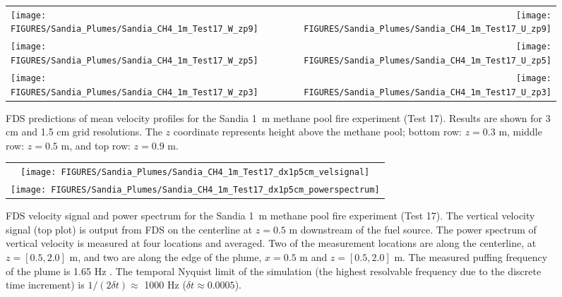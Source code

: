 \begin{figure}[p]
\begin{tabular*}{\textwidth}{l@{\extracolsep{\fill}}r}
\texttt{[image: FIGURES/Sandia\_Plumes/Sandia\_CH4\_1m\_Test17\_W\_zp9]} &
\texttt{[image: FIGURES/Sandia\_Plumes/Sandia\_CH4\_1m\_Test17\_U\_zp9]} \\
\texttt{[image: FIGURES/Sandia\_Plumes/Sandia\_CH4\_1m\_Test17\_W\_zp5]} &
\texttt{[image: FIGURES/Sandia\_Plumes/Sandia\_CH4\_1m\_Test17\_U\_zp5]} \\
\texttt{[image: FIGURES/Sandia\_Plumes/Sandia\_CH4\_1m\_Test17\_W\_zp3]} &
\texttt{[image: FIGURES/Sandia\_Plumes/Sandia\_CH4\_1m\_Test17\_U\_zp3]}
\end{tabular*}
\caption[Sandia 1~m methane pool fire (Test 17) mean velocity profiles]
{FDS predictions of mean velocity profiles for the Sandia 1~m methane pool fire experiment (Test 17). Results are shown for 3 cm and 1.5 cm grid resolutions. The $z$ coordinate represents height above the methane pool; bottom row: $z=0.3$ m, middle row: $z=0.5$ m, and top row: $z=0.9$ m.}
\label{Sandia_CH4_1m_Test17_velocity}
\end{figure}

\begin{figure}[p]
\begin{center}
\begin{tabular}{c}
\texttt{[image: FIGURES/Sandia\_Plumes/Sandia\_CH4\_1m\_Test17\_dx1p5cm\_velsignal]} \\
\texttt{[image: FIGURES/Sandia\_Plumes/Sandia\_CH4\_1m\_Test17\_dx1p5cm\_powerspectrum]}
\end{tabular}
\end{center}
\caption[Sandia 1~m methane pool fire velocity signal and power spectrum]
{FDS velocity signal and power spectrum for the Sandia 1~m methane pool fire experiment (Test 17).  The vertical velocity signal (top plot) is output from FDS on the centerline at $z=0.5$ m downstream of the fuel source.  The power spectrum of vertical velocity is measured at four locations and averaged.  Two of the measurement locations are along the centerline, at $z=[0.5, 2.0]$ m, and two are along the edge of the plume, $x = 0.5$ m and $z=[0.5, 2.0]$ m.  The measured puffing frequency of the plume is 1.65 Hz \cite{Tieszen:2002}.  The temporal Nyquist limit of the simulation (the highest resolvable frequency due to the discrete time increment) is $1/(2\delta t) \approx$ 1000 Hz ($\delta t \approx 0.0005$).}
\label{Sandia_CH4_1m_Test17_spectrum}
\end{figure}

